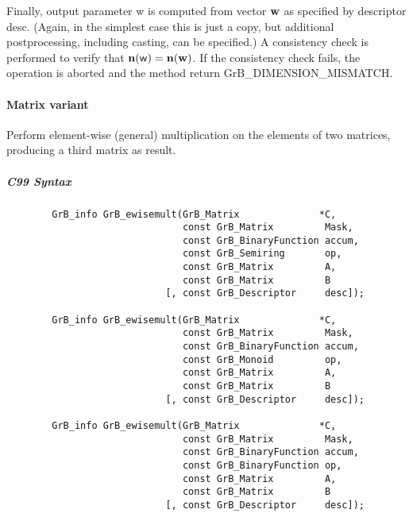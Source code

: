 Finally, output parameter {\sf w} is computed from vector ${\bf w}$
as specified by descriptor {\sf desc}. (Again, in the simplest case this
is just a copy, but additional postprocessing, including casting, can be specified.)  A consistency check is
performed to verify that $\bold{n}({\sf w}) = \bold{n}({\bf w})$. If
the consistency check fails, the operation is aborted and the method
return {\sf GrB\_DIMENSION\_MISMATCH}.


\paragraph{Matrix variant}

Perform element-wise (general) multiplication on the elements of two matrices,
producing a third matrix as result.

\subparagraph{C99 Syntax}

\begin{verbatim}
        GrB_info GrB_ewisemult(GrB_Matrix              *C,
                               const GrB_Matrix         Mask,
                               const GrB_BinaryFunction accum,
                               const GrB_Semiring       op, 
                               const GrB_Matrix         A,
                               const GrB_Matrix         B
                            [, const GrB_Descriptor     desc]);
                            
        GrB_info GrB_ewisemult(GrB_Matrix              *C,
                               const GrB_Matrix         Mask,
                               const GrB_BinaryFunction accum,
                               const GrB_Monoid         op, 
                               const GrB_Matrix         A,
                               const GrB_Matrix         B
                            [, const GrB_Descriptor     desc]);
                            
        GrB_info GrB_ewisemult(GrB_Matrix              *C,
                               const GrB_Matrix         Mask,
                               const GrB_BinaryFunction accum,
                               const GrB_BinaryFunction op, 
                               const GrB_Matrix         A,
                               const GrB_Matrix         B
                            [, const GrB_Descriptor     desc]);
\end{verbatim}

